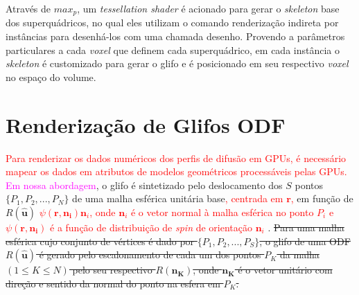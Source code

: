 \documentclass[
    12pt,                %
    oneside,            %
    a4paper,            %
    english,            %
    french,                %
    spanish,            %
    brazil                %
    ]{abntex2}
\begin{document}
Através de $max_p$, um \textit{tessellation shader} é acionado para gerar o \textit{skeleton} base dos superquádricos, no qual eles utilizam o comando renderização indireta por instâncias para desenhá-los com uma chamada desenho. Provendo a parâmetros particulares a cada \textit{voxel} que definem cada superquádrico, em cada instância o \textit{skeleton} é customizado para gerar o glifo e é posicionado em seu respectivo \textit{voxel} no espaço do volume.


\section{Renderização de Glifos ODF}
\label{sec::renderizacao_de_glifos_ODF}

\textcolor{red}{Para renderizar os dados numéricos dos perfis de difusão em GPUs, é necessário mapear os dados em atributos de modelos geométricos processáveis pelas GPUs.} \textcolor{magenta}{Em nossa abordagem}, o glifo é sintetizado pelo deslocamento dos $S$ pontos  $\{
P_1,
P_2, ...,
P_N
\}$
de uma malha esférica unitária base\textcolor{red}{, centrada em $\mathbf{r}$,} em função de \sout{$R(\mathbf{\hat{u}})$} \textcolor{red}{$\psi (\mathbf{r, \mathbf{n}_i}) \mathbf{n}_i$, onde $\mathbf{n}_i$ é o vetor normal à malha esférica no ponto $P_i$ e $\psi (\mathbf{r, \mathbf{n}_i})$ é a função de distribuição de \textit{spin} de orientação $\mathbf{n}_i$} . \sout{Para uma malha esférica cujo conjunto de vértices é dado por $\{
P_1,
P_2, ...,
P_S
\}$, o glifo de uma ODF $R(\mathbf{\hat{u}})$ é gerado pelo escalonamento de cada um dos pontos $P_K$ da malha $(1 \leq K \leq N)$ pelo seu respectivo $R(\mathbf{n_K})$, onde $\mathbf{n_K}$ é o vetor unitário com direção e sentido da normal do ponto na esfera em $P_K$.}


\end{document}
